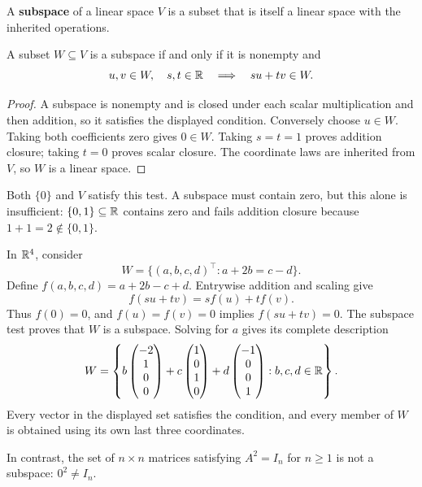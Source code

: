 A \textbf{subspace} of a linear space \(V\) is a subset that is itself
a linear space with the inherited operations.

\begin{proposition}\label{prop:02:subspace}
A subset \(W\subseteq V\) is a subspace if and only if it is nonempty
and
\[
u,v\in W,\quad s,t\in\mathbb R\quad\Longrightarrow\quad su+tv\in W.
\]
\end{proposition}
\begin{proof}
A subspace is nonempty and is closed under each scalar multiplication
and then addition, so it satisfies the displayed condition.
Conversely choose \(u\in W\). Taking both coefficients zero gives
\(0\in W\). Taking \(s=t=1\) proves addition closure; taking \(t=0\)
proves scalar closure. The coordinate laws are inherited from \(V\),
so \(W\) is a linear space.
\end{proof}
Both \(\{0\}\) and \(V\) satisfy this test. A subspace must contain zero,
but this alone is insufficient: \(\{0,1\}\subseteq\mathbb R\) contains zero
and fails addition closure because \(1+1=2\notin\{0,1\}\).

\begin{example}\label{example:02:homogeneous-space}
In \(\mathbb R^4\), consider
\[
W=\{(a,b,c,d)^\top:a+2b=c-d\}.
\]
Define \(f(a,b,c,d)=a+2b-c+d\). Entrywise addition and scaling give
\[
f(su+tv)=sf(u)+tf(v).
\]
Thus \(f(0)=0\), and \(f(u)=f(v)=0\) implies \(f(su+tv)=0\).
The subspace test proves that \(W\) is a subspace. Solving for \(a\) gives its complete description
\[
W=\left\{
 b\begin{pmatrix}-2\\1\\0\\0\end{pmatrix}
+c\begin{pmatrix}1\\0\\1\\0\end{pmatrix}
+d\begin{pmatrix}-1\\0\\0\\1\end{pmatrix}:b,c,d\in\mathbb R
\right\}.
\]
Every vector in the displayed set satisfies the condition, and every
member of \(W\) is obtained using its own last three coordinates.

In contrast, the set of \(n\times n\) matrices satisfying \(A^2=I_n\)
for \(n\geqslant1\) is not a subspace: \(0^2\ne I_n\).
\end{example}

